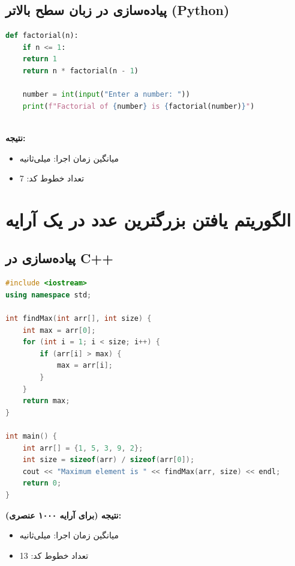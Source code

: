 \documentclass[12pt, a4paper]{report}
\begin{document}
\subsection{پیاده‌سازی در زبان سطح بالاتر (Python)}
\begin{LTR}
	\begin{lstlisting}[language=Python, breaklines=true]
	def factorial(n):
	if n <= 1:
	return 1
	return n * factorial(n - 1)
	
	number = int(input("Enter a number: "))
	print(f"Factorial of {number} is {factorial(number)}")
	
	\end{lstlisting}
\end{LTR}

\textbf{نتیجه:}
\begin{itemize}
	\item میانگین زمان اجرا: \textnormal{} میلی‌ثانیه
	\item تعداد خطوط کد: \textnormal{7}
\end{itemize}

\section{الگوریتم یافتن بزرگترین عدد در یک آرایه}


\subsection{پیاده‌سازی در C++}

\begin{LTR}
	\begin{lstlisting}[language=C++, breaklines=true]
#include <iostream>
using namespace std;

int findMax(int arr[], int size) {
	int max = arr[0];
	for (int i = 1; i < size; i++) {
		if (arr[i] > max) {
			max = arr[i];
		}
	}
	return max;
}

int main() {
	int arr[] = {1, 5, 3, 9, 2};
	int size = sizeof(arr) / sizeof(arr[0]);
	cout << "Maximum element is " << findMax(arr, size) << endl;
	return 0;
}		
	\end{lstlisting}
\end{LTR}

\textbf{نتیجه (برای آرایه ۱۰۰۰ عنصری):}
\begin{itemize}
	\item میانگین زمان اجرا: \textnormal{} میلی‌ثانیه
	\item تعداد خطوط کد: \textnormal{13}
\end{itemize}
\end{document}
